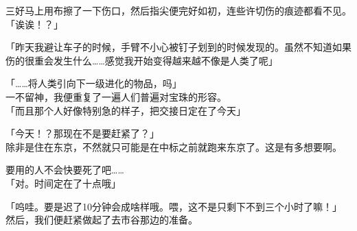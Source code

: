 三好马上用布擦了一下伤口，然后指尖便完好如初，连些许切伤的痕迹都看不见。\\

「诶诶！？」

「昨天我避让车子的时候，手臂不小心被钉子划到的时候发现的。虽然不知道如果伤的很重会发生什么……感觉我开始变得越来越不像是人类了呢」

「……将人类引向下一级进化的物品，吗」\\

一不留神，我便重复了一遍人们普遍对宝珠的形容。\\

「而且那个人好像特别急的样子，把交接日定在了今天」

「今天！？那现在不是要赶紧了？」\\

除非是住在东京，不然就只可能是在中标之前就跑来东京了。这是有多想要啊。

要用的人不会快要死了吧……\\

「对。时间定在了十点哦」

「呜哇。要是迟了10分钟会成啥样哦。喂，这不是只剩下不到三个小时了嘛！」\\

然后，我们便赶紧做起了去市谷那边的准备。\\
